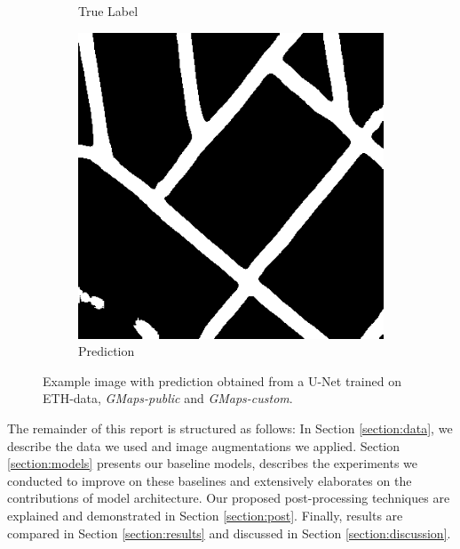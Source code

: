 \begin{figure}
\begin{subfigure}[b]{0.3\linewidth}
     \caption{True Label}
   \end{subfigure}
   \begin{subfigure}[b]{0.3\linewidth}
     \includegraphics[width=\linewidth]{images/144_3_pred_epoch_073_step_38035.png}
     \caption{Prediction}
   \end{subfigure}
   \caption{Example image with prediction obtained from a U-Net trained on ETH-data, \textit{GMaps-public} and \textit{GMaps-custom}.} 
   \label{fig:example}
   \vspace{-6mm}
 \end{figure}

The remainder of this report is structured as follows: In Section \ref{section:data}, we describe the data we used and image augmentations we applied. Section \ref{section:models} presents our baseline models, describes the experiments we conducted to improve on these baselines and extensively elaborates on the contributions of model architecture. Our proposed post-processing techniques are explained and demonstrated in Section \ref{section:post}. Finally, results are compared in Section \ref{section:results} and discussed in Section \ref{section:discussion}.